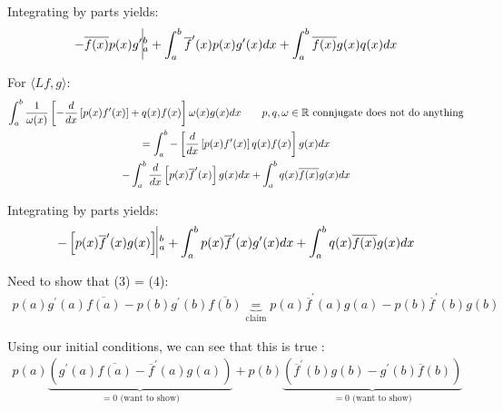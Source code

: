 \par\bigskip
\noindent Integrating by parts yields:
\begin{equation*}
  \begin{gathered}
    -\overline{f(x)}p(x)g^{\prime}\vline_a^b+\int_{a}^{b}\overline{f}^{\prime}(x)p(x)g^{\prime}(x)dx+\int_{a}^{b}\overline{f(x)}g(x)q(x)dx
  \end{gathered}
\end{equation*}
\par\bigskip
\noindent For $\langle Lf,g\rangle$:
\begin{equation*}
  \begin{gathered}
    \int_{a}^{b}\dfrac{1}{\omega(x)}\left[-\dfrac{d}{dx}\left[p(x)f^{\prime}(x)\right]+q(x)f(x)\right]\omega(x)g(x)dx\qquad p,q,\omega\in\mathbb{R}\text{ connjugate does not do anything}\\
    = \int_{a}^{b}-\left[\dfrac{d}{dx}\left[p(x)f^{\prime}(x)\right]q(x)f(x)\right]g(x)dx\\
    -\int_{a}^{b}\dfrac{d}{dx}\left[p(x)\overline{f}^{\prime}(x)\right]g(x)dx+\int_{a}^{b}q(x)\overline{f(x)}g(x)dx\\
  \end{gathered}
\end{equation*}\par
\noindent Integrating by parts yields:
\begin{equation}
  \begin{gathered}
    -\left[p(x)\overline{f}^{\prime}(x)g(x)\right]\vline_a^b+\int_{a}^{b}p(x)\overline{f}^{\prime}(x)g^{\prime}(x)dx+\int_{a}^{b}q(x)\overline{f(x)}g(x)dx
  \end{gathered}
\end{equation}\par
\noindent Need to show that (3) = (4):
\begin{equation*}
  \begin{gathered}
    p(a)g^{\prime}(a)\overline{f(a)}-p(b)g^{\prime}(b)\overline{f(b)} \underbrace{=}_{\text{claim}} p(a)\overline{f}^{\prime}(a)g(a)-p(b)\overline{f}^{\prime}(b)g(b)
  \end{gathered}
\end{equation*}\par
\noindent Using our initial conditions, we can see that this is true :
\begin{equation*}
  \begin{gathered}
    p(a)\underbrace{\left(g^{\prime}(a)\overline{f(a)}-\overline{f}^{\prime}(a)g(a)\right)}_{\text{$=0$ (want to show)}}+p(b)\underbrace{\left(\overline{f}^{\prime}(b)g(b)-g^{\prime}(b)\overline{f}(b)\right)}_{\text{$=0$ (want to show)}}
  \end{gathered}
\end{equation*}
